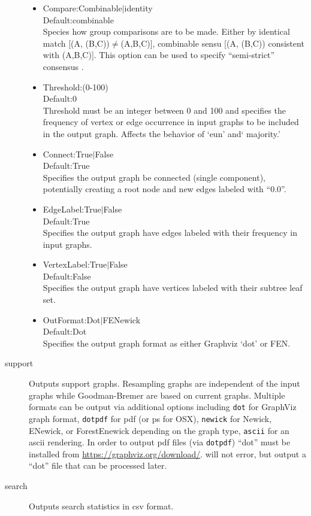 \begin{description}
\begin{itemize}
			\item{Compare:Combinable$\mid$identity\\Default:combinable\\Species how group 
			comparisons are to be made. Either by identical match [(A, (B,C))$\neq$(A,B,C)],
			combinable sensu \cite{Nelson1979} [(A, (B,C)) consistent with (A,B,C)]. This option 
			can be used to specify ``semi-strict'' consensus \citep{Bremer1990}.}
							
			\item{Threshold:(0-100)\\Default:0\\Threshold must be an integer between 0 and 100 
			and specifies the frequency of vertex or edge occurrence in input graphs to be included 
			in the output graph. Affects the behavior of `eun' and` majority.'}
			
			\item{Connect:True$\mid$False\\Default:True\\Specifies the output graph be connected 
			(single component), potentially creating a root node and new edges labeled with ``0.0''.}
			
			\item{EdgeLabel:True$\mid$False\\Default:True\\Specifies the output graph have edges 
			labeled with their frequency in input graphs.}
			
			\item{VertexLabel:True$\mid$False\\Default:False\\Specifies the output graph have vertices 
			labeled with their subtree leaf set.}
	
			\item{OutFormat:Dot$\mid$FENewick\\Default:Dot\\Specifies the output graph format 
			as either Graphviz `dot' or FEN.}
			\end{itemize}	
				
		\item[support] Outputs support graphs. Resampling graphs are independent of the 
		input graphs while Goodman-Bremer are based on current graphs. Multiple formats 
		can be output via additional options including \texttt{dot} for GraphViz graph format, 
		\texttt{dotpdf} for pdf (or ps for OSX), \texttt{newick} for Newick, ENewick, or 
		ForestEnewick depending on the graph type, \texttt{ascii} for an ascii rendering. 
		In order to output pdf files (via \texttt{dotpdf}) ``dot'' must be installed from 
		\url{https://graphviz.org/download/}. \phyg will not error, but output a ``dot'' file that 
		can be processed later.
		
		\item[search] Outputs search statistics in csv format.
		 
	\end{description}			
		
